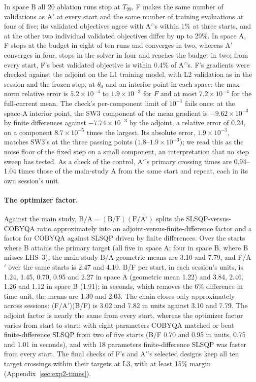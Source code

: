 In space B all 20 ablation runs stop at $T_{99}$. F makes the same number
of validations as A$'$ at every start and the same number of training
evaluations at four of five; its validated objectives agree with A$'$'s
within 1\% at three starts, and at the other two individual validated
objectives differ by up to 29\%. In space A, F stops at the budget in eight
of ten runs and converges in two, whereas A$'$ converges in four, stops in
the solver in four and reaches the budget in two; from every start, F's
best validated objective is within 0.4\% of A$'$'s. F's gradients were
checked against the adjoint on the L1 training model, with L2 validation as
in the session and the frozen step, at $\theta_0$ and an interior point in
each space: the max-norm relative error is $5.2\times10^{-4}$ to
$1.9\times10^{-3}$ for $F$ and at most $7.2\times10^{-4}$ for the
full-current mean. The check's per-component limit of $10^{-1}$ fails once:
at the space-A interior point, the SW3 component of the mean gradient is
$-9.62\times10^{-3}$ by finite differences against $-7.74\times10^{-3}$ by
the adjoint, a relative error of 0.24, on a component $8.7\times10^{-5}$
times the largest. Its absolute error, $1.9\times10^{-3}$, matches SW3's at
the three passing points ($1.8$--$1.9\times10^{-3}$); we read this as the
noise floor of the fixed step on a small component, an interpretation that
no step sweep has tested. As a check of the control,
A$'$'s primary crossing times are 0.94--1.04 times those of the main-study A
from the same start and repeat, each in its own session's unit.

\paragraph{The optimizer factor.}
Against the main study, $\mathrm{B/A}=(\mathrm{B/F})(\mathrm{F/A'})$ splits
the SLSQP-versus-COBYQA ratio approximately into an adjoint-versus-finite-difference
factor and a factor for COBYQA against SLSQP driven by finite differences.
Over the starts where B attains the primary target (all five in space A;
four in space B, where B misses LHS~3), the main-study B/A geometric means
are 3.10 and 7.79, and F/A$'$ over the same starts is 2.47 and 4.10. B/F
per start, in each session's units, is 1.24, 1.45, 0.70, 0.95 and 2.27 in
space A (geometric mean 1.22) and 3.84, 2.46, 1.26 and 1.12 in space B
(1.91); in seconds, which removes the 6\% difference in time unit, the
means are 1.30 and 2.03. The chain closes only approximately across
sessions: (F/A$'$)(B/F) is 3.02 and 7.82 in units against 3.10 and 7.79.
The adjoint factor is nearly the same from every start, whereas the
optimizer factor varies from start to start: with eight parameters COBYQA
matched or beat finite-difference SLSQP from two of five starts (B/F 0.70
and 0.95 in units, 0.75 and 1.01 in seconds), and with 18 parameters
finite-difference SLSQP was faster from every start. The final checks of
F's and A$'$'s selected designs keep all ten target crossings within their
targets at L3, with at least 15\% margin (Appendix~\ref{sec:exp2-times}).
